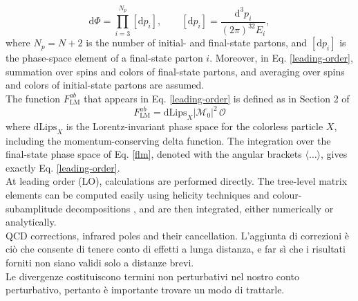 \documentclass[a4paper, 12pt]{book}
\begin{document}
\begin{equation}
    \mathrm{d}\Phi=\prod_{i=3}^{N_p} [\mathrm{d}p_i], \qquad [\mathrm{d}p_i]=\frac{\mathrm{d}^3p_i}{(2\pi)^32E_i},
\end{equation}
where $N_p=N+2$ is the number of initial- and final-state partons, and $[\mathrm{d}p_i]$ is the phase-space element of a final-state parton $i$. Moreover, in Eq. \ref{leading-order}, summation over spins and colors of final-state partons, and averaging over spins and colors of initial-state partons are assumed.  \\
The function $F^{ab}_{\mathrm{LM}}$ that appears in Eq. \ref{leading-order} is defined as in Section 2 of \cite{Devoto:2023rpv}
\begin{equation}
    F^{ab}_{\mathrm{LM}} = \mathrm{dLips}_X |\mathcal{M}_0|^2 \, \mathcal{O}
    \label{flm}
\end{equation}
where $\mathrm{dLips}_X$ is the Lorentz-invariant phase space for the colorless particle $X$, including the momentum-conserving delta function. The integration over the final-state phase space of Eq. \ref{flm}, denoted with the angular brackets $\langle\dots\rangle$, gives exactly Eq. \ref{leading-order}. \\
At leading order (LO), calculations are performed directly. The tree-level matrix elements can be computed easily using helicity techniques and colour-subamplitude decompositions \cite{Altarelli:1977zs}, and are then integrated, either numerically or analytically. \\



QCD corrections, infrared poles and their cancellation. L'aggiunta di correzioni è ciò che consente di tenere conto di effetti a lunga distanza, e far sì che i risultati forniti non siano validi solo a distanze brevi.\\
Le divergenze costituiscono termini non perturbativi nel nostro conto perturbativo, pertanto è importante trovare un modo di trattarle.
\\
\end{document}

